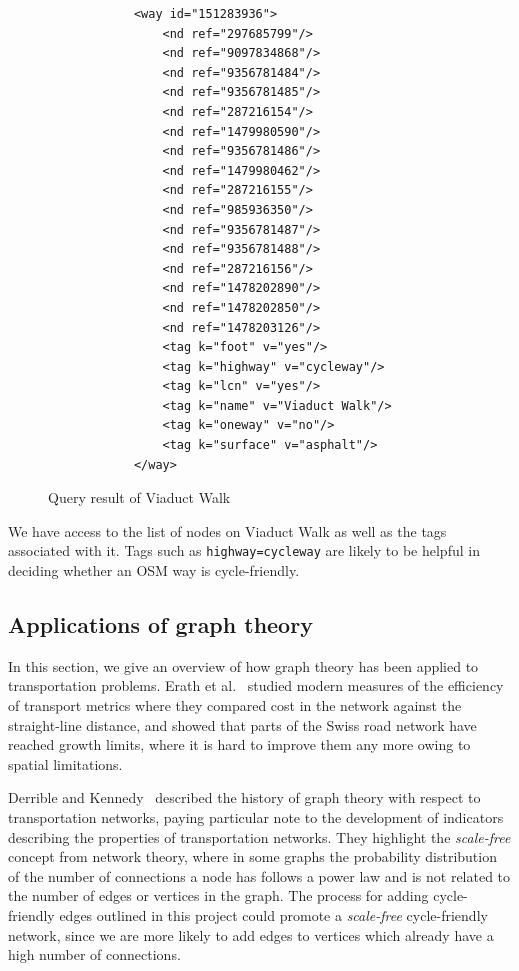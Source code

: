 \documentclass[12pt,a4paper]{report}
\begin{document}
\begin{figure}[ht]
    \centering
    \begin{minipage}[c]{\textwidth}
        \begin{verbatim}
            <way id="151283936">
                <nd ref="297685799"/>
                <nd ref="9097834868"/>
                <nd ref="9356781484"/>
                <nd ref="9356781485"/>
                <nd ref="287216154"/>
                <nd ref="1479980590"/>
                <nd ref="9356781486"/>
                <nd ref="1479980462"/>
                <nd ref="287216155"/>
                <nd ref="985936350"/>
                <nd ref="9356781487"/>
                <nd ref="9356781488"/>
                <nd ref="287216156"/>
                <nd ref="1478202890"/>
                <nd ref="1478202850"/>
                <nd ref="1478203126"/>
                <tag k="foot" v="yes"/>
                <tag k="highway" v="cycleway"/>
                <tag k="lcn" v="yes"/>
                <tag k="name" v="Viaduct Walk"/>
                <tag k="oneway" v="no"/>
                <tag k="surface" v="asphalt"/>
            </way>
        \end{verbatim}
    \end{minipage}
    \caption{Query result of Viaduct Walk}
    \label{fig:query}
\end{figure}

We have access to the list of nodes on Viaduct Walk as well as the tags associated with it. Tags such as \texttt{highway=cycleway} are likely to be helpful in deciding whether an OSM way is cycle-friendly.

\subsection{Applications of graph theory}
In this section, we give an overview of how graph theory has been applied to transportation problems. Erath et al.~\cite{erath2009} studied modern measures of the efficiency of transport metrics where they compared cost in the network against the straight-line distance, and showed that parts of the Swiss road network have reached growth limits, where it is hard to improve them any more owing to spatial limitations.

Derrible and Kennedy~\cite{derrible2011} described the history of graph theory with respect to transportation networks, paying particular note to the development of indicators describing the properties of transportation networks. They highlight the \textit{scale-free} concept from network theory, where in some graphs the probability distribution of the number of connections a node has follows a power law and is not related to the number of edges or vertices in the graph. The process for adding cycle-friendly edges outlined in this project could promote a \textit{scale-free} cycle-friendly network, since we are more likely to add edges to vertices which already have a high number of connections. 
\end{document}
